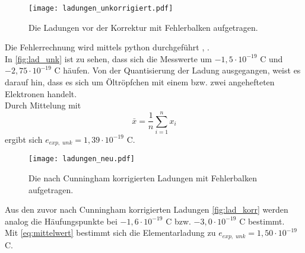 \begin{figure}[h]
  \centering
  \texttt{[image: ladungen\_unkorrigiert.pdf]}
  \caption{Die Ladungen vor der Korrektur mit Fehlerbalken aufgetragen.}
  \label{fig:lad_unk}
\end{figure}

Die Fehlerrechnung wird mittels python durchgeführt \cite{uncertainties}, \cite{numpy} .\\
In \autoref{fig:lad_unk} ist zu sehen, dass sich die Messwerte um $-1,5 \cdot 10^{-19}$ C und $-2,75 \cdot 10^{-19}$ C häufen. 
Von der Quantisierung der Ladung ausgegangen, weist es darauf hin, dass es sich um Öltröpfchen mit einem bzw. zwei angehefteten Elektronen handelt.\\
Durch Mittelung mit 
\begin{equation}
  \bar{x}=\frac{1}{n}\sum_{i=1}^n x_i
  \label{eq:mittelwert}
\end{equation}
ergibt sich $e_{exp, \; unk} = 1,39 \cdot 10^{-19}$ C.

\begin{figure}
  \centering
  \texttt{[image: ladungen\_neu.pdf]}
  \caption{Die nach Cunningham korrigierten Ladungen mit Fehlerbalken aufgetragen.}
  \label{fig:lad_korr}
\end{figure}
Aus den zuvor nach Cunningham korrigierten Ladungen \autoref{fig:lad_korr} werden analog die Häufungspunkte
bei $-1,6 \cdot 10^{-19}$ C bzw. $-3,0 \cdot 10^{-19}$ C bestimmt. \\
Mit \autoref{eq:mittelwert} bestimmt sich die Elementarladung zu $e_{exp, \; unk} = 1,50 \cdot 10^{-19}$ C.
